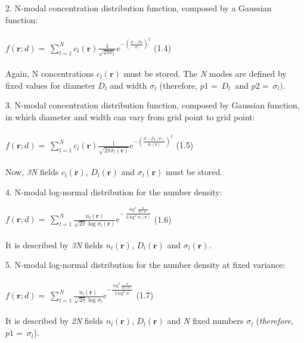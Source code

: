 2. N-modal concentration distribution function, composed by a Gaussian function:\\
~\\
\(f\left( \mathbf{r};d \right) = \ \sum_{l = 1}^{N}{c_{l}\left( \mathbf{r} \right)\frac{1}{\sqrt{2\pi\sigma_{l}}}e^{- \left( \frac{d - D_{l}}{\sigma_{l}} \right)^{2}}}\) (1.4)\\
~\\
Again, N concentrations \(c_{l}\left( \mathbf{r} \right)\) must be stored. The \emph{N} modes are defined by fixed values for diameter \(D_{l}\) and width \(\sigma_{l}\) (therefore, \(p1 = \ D_{l}\ \) and \(p2 = \ \sigma_{l}).\)

3. N-modal concentration distribution function, composed by Gaussian function, in which diameter and width can vary from grid point to grid point:\\
~\\
\(f\left( \mathbf{r};d \right) = \ \sum_{l = 1}^{N}{c_{l}\left( \mathbf{r} \right)\frac{1}{\sqrt{2\pi\sigma_{l}\left( \mathbf{r} \right)}}e^{- \left( \frac{d - D_{l}\left( \mathbf{r} \right)}{\sigma_{l}\left( \mathbf{r} \right)} \right)^{2}}}\) (1.5)\\
~\\
Now, \emph{3N} fields \(c_{l}\left( \mathbf{r} \right)\), \(D_{l}\left( \mathbf{r} \right)\) and \(\sigma_{l}\left( \mathbf{r} \right)\) must be stored.

4. N-modal log-normal distribution for the number density:

\(f\left( \mathbf{r};d \right) = \ \sum_{l = 1}^{N}{\frac{n_{l}\left( \mathbf{r} \right)}{\sqrt{2\pi}\log{\sigma_{l}\left( \mathbf{r} \right)}}e}^{- \ \frac{\log^{2}\frac{d}{D_{l}\left( \mathbf{r} \right)}}{2\log^{2}\sigma_{l}\left( \mathbf{r} \right)}}\) (1.6)\\
~\\
It is described by \emph{3N} fields \(n_{l}\left( \mathbf{r} \right)\), \(D_{l}\left( \mathbf{r} \right)\) and \(\sigma_{l}\left( \mathbf{r} \right)\).

5. N-modal log-normal distribution for the number density at fixed variance:\\
~\\
\(f\left( \mathbf{r};d \right) = \ \sum_{l = 1}^{N}{\frac{n_{l}\left( \mathbf{r} \right)}{\sqrt{2\pi}\log\sigma_{l}}e}^{- \frac{\log^{2}\frac{d}{D_{l}\left( \mathbf{r} \right)}}{2\log^{2}\sigma_{l}}}\) (1.7)\\
~\\
It is described by \emph{2N} fields \(n_{l}\left( \mathbf{r} \right)\), \(D_{l}\left( \mathbf{r} \right)\) and \emph{N} fixed numbers \(\sigma_{l}\) (\emph{therefore}, \(p1 = \ \sigma_{l}\)).

